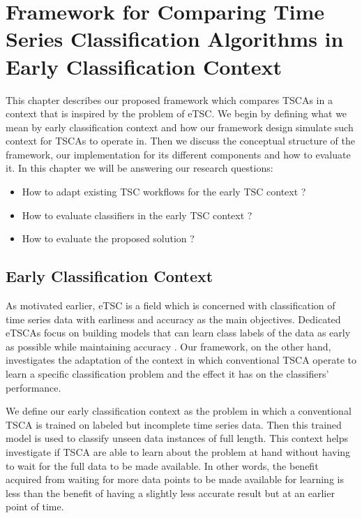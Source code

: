 \chapter{Framework for Comparing Time Series Classification Algorithms in Early Classification Context}
\label{ChapterFramework}
This chapter describes our proposed framework which compares TSCAs in a context that is inspired by the problem of eTSC.
We begin by defining what we mean by early classification context and how our framework design simulate such context for TSCAs to operate in.
Then we discuss the conceptual structure of the framework, our implementation for its different components and how to evaluate it.
In this chapter we will be answering our research questions:
\begin{itemize}
  \item How to adapt existing TSC workflows for the early TSC context ?
  \item How to evaluate classifiers in the early TSC context ?
  \item How to evaluate the proposed solution ?
\end{itemize}


\section{Early Classification Context}
\label{SectionEarlyClassificationContext}
As motivated earlier, eTSC is a field which is concerned with classification of time series data with earliness and accuracy
as the main objectives. Dedicated eTSCAs focus on building models that can learn class labels of the data as early as possible
while maintaining accuracy \cite{mori2017early}.
Our framework, on the other hand, investigates the adaptation of the context in which conventional TSCA operate to learn a specific
classification problem and the effect it has on the classifiers' performance.

We define our early classification context as the problem in which a conventional TSCA is trained on labeled but incomplete time series data.
Then this trained model is used to classify unseen data instances of full length.
This context helps investigate if TSCA are able to learn about the problem at hand without having to wait for the full data to be made available.
In other words, the benefit acquired from waiting for more data points to be made available for learning is less than the benefit of having a slightly less accurate result but at an earlier point of time.

